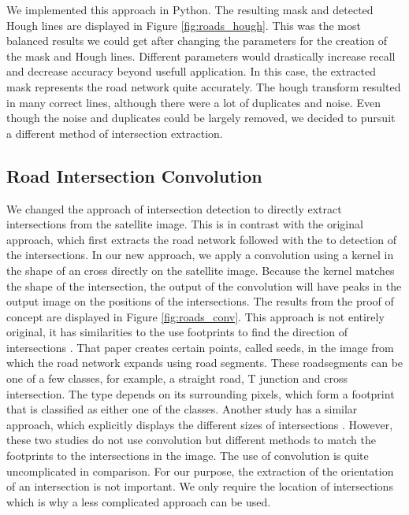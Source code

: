 We implemented this approach in Python. The resulting mask and detected Hough lines are displayed in Figure \ref{fig:roads_hough}. This was the most balanced results we could get after changing the parameters for the creation of the mask and Hough lines. Different parameters would drastically increase recall and decrease accuracy beyond usefull application. In this case, the extracted mask  represents the road network quite accurately. The hough transform resulted in many correct lines, although there were a lot of duplicates and noise. Even though the noise and duplicates could be largely removed, we decided to pursuit a different method of intersection extraction. 

\subsection{Road Intersection Convolution}
We changed the approach of intersection detection to directly extract intersections from the satellite image. This is in contrast with the original approach, which first extracts the road network followed with the to detection of the intersections. In our new approach, we apply a convolution using a kernel in the shape of an cross directly on the satellite image. Because the kernel matches the shape of the intersection, the output of the convolution will have peaks in the output image on the positions of the intersections. The results from the proof of concept are displayed in Figure \ref{fig:roads_conv}. This approach is not entirely original, it has similarities to the use footprints to find the direction of intersections \cite{hu2007road}. That paper creates certain points, called seeds, in the image from which the road network expands using road segments. These roadsegments can be one of a few classes, for example, a straight road, T junction and cross intersection. The type depends on its surrounding pixels, which form a footprint that is classified as either one of the classes. Another study has a similar approach, which explicitly displays the different sizes of intersections \cite{koutaki2004automatic}. However, these two studies do not use convolution but different methods to match the footprints to the intersections in the image. The use of convolution is quite uncomplicated in comparison. For our purpose, the extraction of the orientation of an intersection is not important. We only require the location of intersections which is why a less complicated approach can be used.

